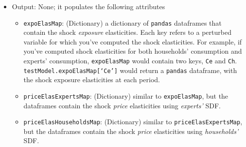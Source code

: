 \documentclass[12pt]{article}
\newcommand{\wealthProg}{W}
\newcommand{\stochasticVolProg}{V}
\newcommand{\growthProg}{Z}
\newcommand{\idioVolProg}{Vtilde}
\begin{document}
\begin{itemize}
\begin{itemize}
            \item \texttt{perturb}: (String) The name of the variable that you want to shock
            as part of the elasticity computation. Possible parameters are
            \texttt{`\wealthProg'} (the wealth share), \texttt{`Q'} (the capital price),
            \texttt{`C'} (aggregate consumption), \texttt{`Ce'} (expert consumption),
            and \texttt{`Ch'} (household consumption). Additionally,
            \texttt{`\growthProg'} (growth),
            \texttt{`\stochasticVolProg'} (stochastic volatility volatility),
            and \texttt{`\idioVolProg'} (idiosyncratic volatility)
            can be included if they
            were given positive grid points and positive volatility in the
            parameters. Default is \texttt{`C'}.

            \item \texttt{bc}: (Dictionary) Boundary conditions for the PDE. Refer to the
            documentation for \texttt{bc} in Section \ref{sec:1} for more
            information. By default the dictionary is empty. When you use an empty dictionary for \texttt{bc}, the function uses zero first derivatives as
            the boundary conditions.

        \end{itemize}
        
\item Output: None; it populates the following attributes

\begin{itemize}
\item  \texttt{expoElasMap}: (Dictionary) a dictionary of \texttt{pandas} dataframes that contain the shock \textit{exposure} elasticities. Each key refers to a perturbed variable for which you've computed the shock elasticities. For example, if you've computed shock elasticities for both households' consumption and experts' consumption, \texttt{expoElasMap} would contain two keys, \texttt{Ce} and \texttt{Ch}. \texttt{testModel.expoElasMap[`Ce']} would return a \texttt{pandas} dataframe, with the shock exposure elasticities at each period.
\item \texttt{priceElasExpertsMap}: (Dictionary) similar to \texttt{expoElasMap}, but the dataframes contain the shock \textit{price} elasticities using \textit{experts'} SDF.
\item \texttt{priceElasHouseholdsMap}: (Dictionary) similar to \texttt{priceElasExpertsMap}, but the dataframes contain the shock \textit{price} elasticities using \textit{households'} SDF.
\end{itemize}
\end{itemize}
\end{document}
